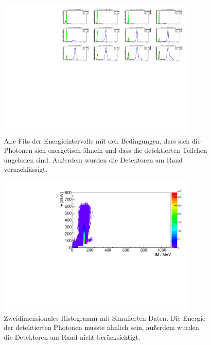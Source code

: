 \documentclass[a4paper,11pt,oneside,final,german,openbib,pdftex]{scrbook}
\begin{document}
{\begin{appendix}
\begin{figure}[h!]
	\begin{center}
		\includegraphics[width=100mm]{NewCalib/Strahlzeit2014/20171904Real30DegreeCutAllFits}
		\caption[Strahlzeit: 2D-Hist ohne Detektoren am Rand; alle Fits]{Alle Fits der Energieintervalle mit den Bedingungen, dass sich die Photonen sich energetisch ähneln und dass die detektierten Teilchen ungeladen sind. Au{\ss}erdem wurden die Detektoren am Rand vernachl\"assigt.}
		\label{fig:30-Degree-Cut-RealData-All-Fits}
	\end{center}
\end{figure}






\begin{figure}[h!]
	\begin{center}
		\includegraphics[width=100mm]{NewCalib/20171904Sim30DegreeCut}
		\caption[Simulation: 2D-Hist; Ohne Detektoren am Rand]{Zweidimensionales Histogramm mit Simulierten Daten. Die Energie der detektierten Photonen musste \"ahnlich sein, au{\ss}erdem wurden die Detektoren am Rand nicht ber\"ucksichtigt.}
		\label{fig:Sim-Data-2DHist-30-Degree-Edge}
	\end{center}
\end{figure}



\end{appendix}}
\end{document}

